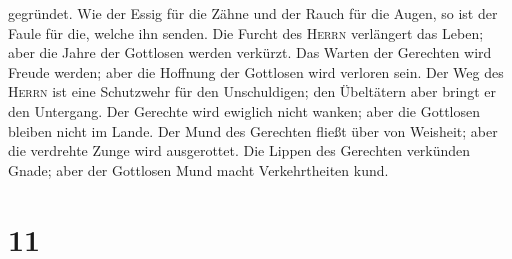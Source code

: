 gegründet.  Wie der Essig für die Zähne und der Rauch für
die Augen, so ist der Faule für die, welche ihn senden. 
Die Furcht des \textsc{Herrn} verlängert das Leben; aber die Jahre der
Gottlosen werden verkürzt.  Das Warten der Gerechten wird
Freude werden; aber die Hoffnung der Gottlosen wird verloren sein.
 Der Weg des \textsc{Herrn} ist eine Schutzwehr für den
Unschuldigen; den Übeltätern aber bringt er den Untergang.
 Der Gerechte wird ewiglich nicht wanken; aber die
Gottlosen bleiben nicht im Lande.  Der Mund des Gerechten
fließt über von Weisheit; aber die verdrehte Zunge wird ausgerottet.
 Die Lippen des Gerechten verkünden Gnade; aber der
Gottlosen Mund macht Verkehrtheiten kund.

\hypertarget{section-10}{%
\section{11}\label{section-10}}

